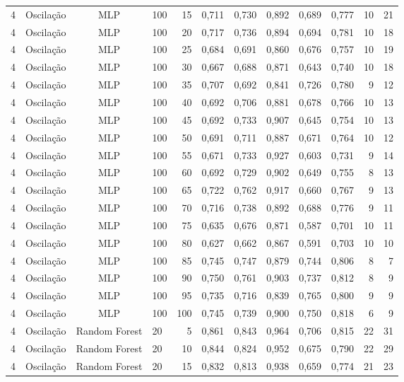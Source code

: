 \begin{longtable}{ccclrrrrrrrr}
4 & Oscilação & MLP & 100 & 15 & 0,711 & 0,730 & 0,892 & 0,689 & 0,777 & 10 & 21 \\
4 & Oscilação & MLP & 100 & 20 & 0,717 & 0,736 & 0,894 & 0,694 & 0,781 & 10 & 18 \\
4 & Oscilação & MLP & 100 & 25 & 0,684 & 0,691 & 0,860 & 0,676 & 0,757 & 10 & 19 \\
4 & Oscilação & MLP & 100 & 30 & 0,667 & 0,688 & 0,871 & 0,643 & 0,740 & 10 & 18 \\
4 & Oscilação & MLP & 100 & 35 & 0,707 & 0,692 & 0,841 & 0,726 & 0,780 & 9 & 12 \\
4 & Oscilação & MLP & 100 & 40 & 0,692 & 0,706 & 0,881 & 0,678 & 0,766 & 10 & 13 \\
4 & Oscilação & MLP & 100 & 45 & 0,692 & 0,733 & 0,907 & 0,645 & 0,754 & 10 & 13 \\
4 & Oscilação & MLP & 100 & 50 & 0,691 & 0,711 & 0,887 & 0,671 & 0,764 & 10 & 12 \\
4 & Oscilação & MLP & 100 & 55 & 0,671 & 0,733 & 0,927 & 0,603 & 0,731 & 9 & 14 \\
4 & Oscilação & MLP & 100 & 60 & 0,692 & 0,729 & 0,902 & 0,649 & 0,755 & 8 & 13 \\
4 & Oscilação & MLP & 100 & 65 & 0,722 & 0,762 & 0,917 & 0,660 & 0,767 & 9 & 13 \\
4 & Oscilação & MLP & 100 & 70 & 0,716 & 0,738 & 0,892 & 0,688 & 0,776 & 9 & 11 \\
4 & Oscilação & MLP & 100 & 75 & 0,635 & 0,676 & 0,871 & 0,587 & 0,701 & 10 & 11 \\
4 & Oscilação & MLP & 100 & 80 & 0,627 & 0,662 & 0,867 & 0,591 & 0,703 & 10 & 10 \\
4 & Oscilação & MLP & 100 & 85 & 0,745 & 0,747 & 0,879 & 0,744 & 0,806 & 8 & 7 \\
4 & Oscilação & MLP & 100 & 90 & 0,750 & 0,761 & 0,903 & 0,737 & 0,812 & 8 & 9 \\
4 & Oscilação & MLP & 100 & 95 & 0,735 & 0,716 & 0,839 & 0,765 & 0,800 & 9 & 9 \\
4 & Oscilação & MLP & 100 & 100 & 0,745 & 0,739 & 0,900 & 0,750 & 0,818 & 6 & 9 \\
4 & Oscilação & Random Forest & 20 & 5 & 0,861 & 0,843 & 0,964 & 0,706 & 0,815 & 22 & 31 \\
4 & Oscilação & Random Forest & 20 & 10 & 0,844 & 0,824 & 0,952 & 0,675 & 0,790 & 22 & 29 \\
4 & Oscilação & Random Forest & 20 & 15 & 0,832 & 0,813 & 0,938 & 0,659 & 0,774 & 21 & 23 \\

\end{longtable}
